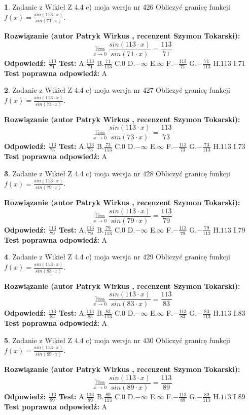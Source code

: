 \documentclass[12pt, a4paper]{article}
\theoremstyle{definition} %
\newtheorem{zad}{}
\newcommand{\zadStart}[1]{\begin{zad}#1\newline}
\newcommand{\zadStop}{\end{zad}}
\newcommand{\rozwStart}[2]{\noindent \textbf{Rozwiązanie (autor #1 , recenzent #2): }\newline}
\newcommand{\rozwStop}{\newline}
\newcommand{\odpStart}{\noindent \textbf{Odpowiedź:}\newline}
\newcommand{\odpStop}{\newline}
\newcommand{\testStart}{\noindent \textbf{Test:}\newline}
\newcommand{\testStop}{\newline}
\newcommand{\kluczStart}{\noindent \textbf{Test poprawna odpowiedź:}\newline}
\newcommand{\kluczStop}{\newline}
\begin{document}
\zadStart{Zadanie z Wikieł Z 4.4 c) moja wersja nr 426}
Obliczyć granicę funkcji $f(x)=\frac{sin(113\cdot x)}{sin(71\cdot x)}$.
\zadStop
\rozwStart{Patryk Wirkus}{Szymon Tokarski}
$$\lim\limits_{x\to 0}\frac{sin(113\cdot x)}{sin(71\cdot x)}=
\frac{113}{71}$$
\rozwStop
\odpStart
$\frac{113}{71}$
\odpStop
\testStart
A.$\frac{113}{71}$
B.$\frac{71}{113}$
C.$0$
D.$-\infty$
E.$\infty$
F.$-\frac{113}{71}$
G.$-\frac{71}{113}$
H.$113$
I.$71$
\testStop
\kluczStart
A
\kluczStop



\zadStart{Zadanie z Wikieł Z 4.4 c) moja wersja nr 427}
Obliczyć granicę funkcji $f(x)=\frac{sin(113\cdot x)}{sin(73\cdot x)}$.
\zadStop
\rozwStart{Patryk Wirkus}{Szymon Tokarski}
$$\lim\limits_{x\to 0}\frac{sin(113\cdot x)}{sin(73\cdot x)}=
\frac{113}{73}$$
\rozwStop
\odpStart
$\frac{113}{73}$
\odpStop
\testStart
A.$\frac{113}{73}$
B.$\frac{73}{113}$
C.$0$
D.$-\infty$
E.$\infty$
F.$-\frac{113}{73}$
G.$-\frac{73}{113}$
H.$113$
I.$73$
\testStop
\kluczStart
A
\kluczStop



\zadStart{Zadanie z Wikieł Z 4.4 c) moja wersja nr 428}
Obliczyć granicę funkcji $f(x)=\frac{sin(113\cdot x)}{sin(79\cdot x)}$.
\zadStop
\rozwStart{Patryk Wirkus}{Szymon Tokarski}
$$\lim\limits_{x\to 0}\frac{sin(113\cdot x)}{sin(79\cdot x)}=
\frac{113}{79}$$
\rozwStop
\odpStart
$\frac{113}{79}$
\odpStop
\testStart
A.$\frac{113}{79}$
B.$\frac{79}{113}$
C.$0$
D.$-\infty$
E.$\infty$
F.$-\frac{113}{79}$
G.$-\frac{79}{113}$
H.$113$
I.$79$
\testStop
\kluczStart
A
\kluczStop



\zadStart{Zadanie z Wikieł Z 4.4 c) moja wersja nr 429}
Obliczyć granicę funkcji $f(x)=\frac{sin(113\cdot x)}{sin(83\cdot x)}$.
\zadStop
\rozwStart{Patryk Wirkus}{Szymon Tokarski}
$$\lim\limits_{x\to 0}\frac{sin(113\cdot x)}{sin(83\cdot x)}=
\frac{113}{83}$$
\rozwStop
\odpStart
$\frac{113}{83}$
\odpStop
\testStart
A.$\frac{113}{83}$
B.$\frac{83}{113}$
C.$0$
D.$-\infty$
E.$\infty$
F.$-\frac{113}{83}$
G.$-\frac{83}{113}$
H.$113$
I.$83$
\testStop
\kluczStart
A
\kluczStop



\zadStart{Zadanie z Wikieł Z 4.4 c) moja wersja nr 430}
Obliczyć granicę funkcji $f(x)=\frac{sin(113\cdot x)}{sin(89\cdot x)}$.
\zadStop
\rozwStart{Patryk Wirkus}{Szymon Tokarski}
$$\lim\limits_{x\to 0}\frac{sin(113\cdot x)}{sin(89\cdot x)}=
\frac{113}{89}$$
\rozwStop
\odpStart
$\frac{113}{89}$
\odpStop
\testStart
A.$\frac{113}{89}$
B.$\frac{89}{113}$
C.$0$
D.$-\infty$
E.$\infty$
F.$-\frac{113}{89}$
G.$-\frac{89}{113}$
H.$113$
I.$89$
\testStop
\kluczStart
A
\kluczStop
\end{document}

